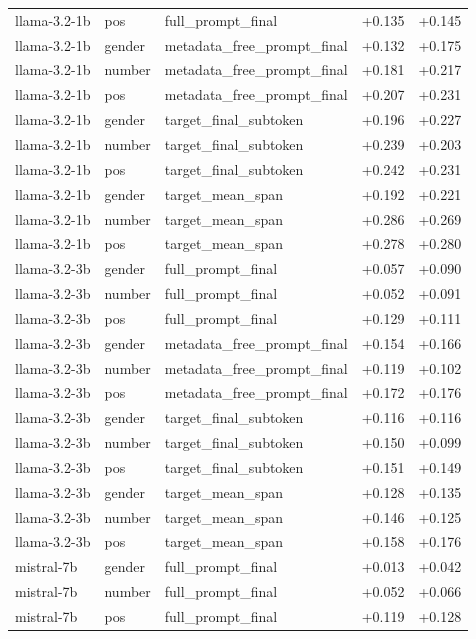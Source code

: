 \begin{tabular}{lllrr}
llama-3.2-1b & pos & full_prompt_final & +0.135 & +0.145 \\
llama-3.2-1b & gender & metadata_free_prompt_final & +0.132 & +0.175 \\
llama-3.2-1b & number & metadata_free_prompt_final & +0.181 & +0.217 \\
llama-3.2-1b & pos & metadata_free_prompt_final & +0.207 & +0.231 \\
llama-3.2-1b & gender & target_final_subtoken & +0.196 & +0.227 \\
llama-3.2-1b & number & target_final_subtoken & +0.239 & +0.203 \\
llama-3.2-1b & pos & target_final_subtoken & +0.242 & +0.231 \\
llama-3.2-1b & gender & target_mean_span & +0.192 & +0.221 \\
llama-3.2-1b & number & target_mean_span & +0.286 & +0.269 \\
llama-3.2-1b & pos & target_mean_span & +0.278 & +0.280 \\
llama-3.2-3b & gender & full_prompt_final & +0.057 & +0.090 \\
llama-3.2-3b & number & full_prompt_final & +0.052 & +0.091 \\
llama-3.2-3b & pos & full_prompt_final & +0.129 & +0.111 \\
llama-3.2-3b & gender & metadata_free_prompt_final & +0.154 & +0.166 \\
llama-3.2-3b & number & metadata_free_prompt_final & +0.119 & +0.102 \\
llama-3.2-3b & pos & metadata_free_prompt_final & +0.172 & +0.176 \\
llama-3.2-3b & gender & target_final_subtoken & +0.116 & +0.116 \\
llama-3.2-3b & number & target_final_subtoken & +0.150 & +0.099 \\
llama-3.2-3b & pos & target_final_subtoken & +0.151 & +0.149 \\
llama-3.2-3b & gender & target_mean_span & +0.128 & +0.135 \\
llama-3.2-3b & number & target_mean_span & +0.146 & +0.125 \\
llama-3.2-3b & pos & target_mean_span & +0.158 & +0.176 \\
mistral-7b & gender & full_prompt_final & +0.013 & +0.042 \\
mistral-7b & number & full_prompt_final & +0.052 & +0.066 \\
mistral-7b & pos & full_prompt_final & +0.119 & +0.128 \\

\end{tabular}

